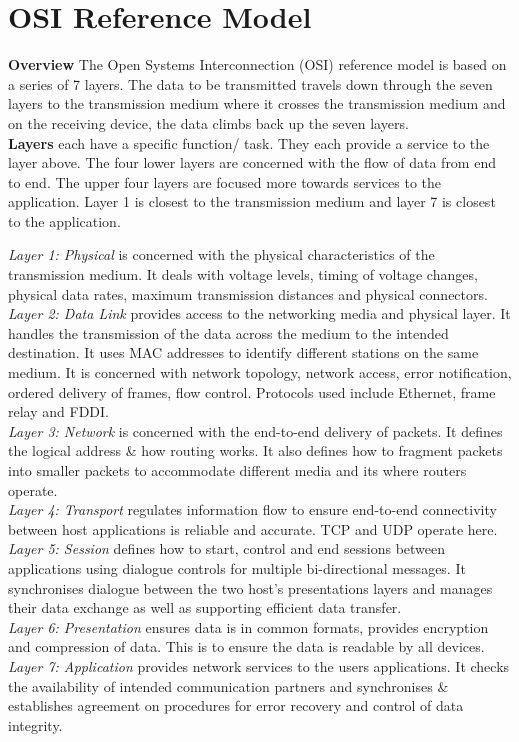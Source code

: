 \documentclass[a4paper,11pt]{article}
\begin{document}
\section{OSI Reference Model}
\textbf{Overview} The Open Systems Interconnection (OSI) reference model is based on a series of 7 layers. The data to be transmitted travels down through the seven layers to the transmission medium where it crosses the transmission medium and on the receiving device, the data climbs back up the seven layers.\\
\textbf{Layers} each have a specific function/ task. They each provide a service to the layer above. The four lower layers are concerned with the flow of data from end to end. The upper four layers are focused more towards services to the application. Layer 1 is closest to the transmission medium and layer 7 is closest to the application.
\begin{adjustwidth}{2em}{1em} 
\textit{Layer 1: Physical} is concerned with the physical characteristics of the transmission medium. It deals with voltage levels, timing of voltage changes, physical data rates, maximum transmission distances and physical connectors.\\
\textit{Layer 2: Data Link} provides access to the networking media and physical layer. It handles the transmission of the data across the medium to the intended destination. It uses MAC addresses to identify different stations on the same medium. It is concerned with network topology, network access, error notification, ordered delivery of frames, flow control. Protocols used include Ethernet, frame relay and FDDI. \\
\textit{Layer 3: Network} is concerned with the end-to-end delivery of packets. It defines the logical address \& how routing works. It also defines how to fragment packets into smaller packets to accommodate different media and its where routers operate.\\
\textit{Layer 4: Transport} regulates information flow to ensure end-to-end connectivity between host applications is reliable and accurate. TCP and UDP operate here.\\
\textit{Layer 5: Session} defines how to start, control and end sessions between applications using dialogue controls for multiple bi-directional messages. It synchronises dialogue between the two host's presentations layers and manages their data exchange as well as supporting efficient data transfer.\\
\textit{Layer 6: Presentation} ensures data is in common formats, provides encryption and compression of data. This is to ensure the data is readable by all devices.\\
\textit{Layer 7: Application} provides network services to the users applications. It checks the availability of intended communication partners and synchronises \& establishes agreement on procedures for error recovery and control of data integrity.
\end{adjustwidth}
\end{document}
